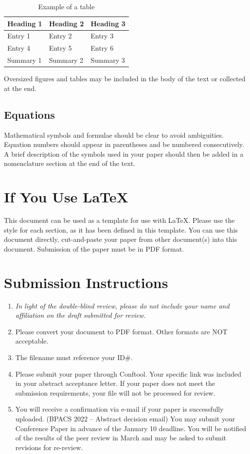 \documentclass[twocolumn, 10pt, times, letterpaper]{article}
\begin{document}
\begin{table}[h!]
\caption{Example of a table}
\centering
\begin{tabular}{lll} \hline
\bf Heading 1 & \bf Heading 2 & \bf Heading 3 \\ \hline
Entry 1 & Entry 2 & Entry 3 \\ 
Entry 4 & Entry 5 & Entry 6 \\ \hline
Summary 1 & Summary 2 & Summary 3 \\ 
\end{tabular}
\label{table1}
\end{table}

Oversized figures and tables may be included in the body of the text or collected at the end. 

\subsection{Equations}
Mathematical symbols and formulae should be clear to avoid ambiguities. Equation numbers should appear in parentheses and be numbered consecutively. A brief description of the symbols used in your paper should then be added in a nomenclature section at the end of the text.

\section{If You Use \LaTeX}
This document can be used as a template for use with \LaTeX. Please use the style for each section, as it has been defined in this template. You can use this document directly, cut-and-paste your paper from other document(s) into this document.
Submission of the paper must be in PDF format.

\section{Submission Instructions}
\begin{enumerate}
\setlength\itemsep{0em}
\item {\it In light of the double-blind review, please do not include your name and affiliation on the draft submitted for review.}
\item Please convert your document to PDF format. Other formats are NOT acceptable.
\item The filename must reference your ID\#. 
\item Please submit your paper through Conftool. Your specific link was included in your abstract acceptance letter.  If your paper does not meet the submission requirements, your file will not be processed for review. 
\item  You will receive a confirmation via e-mail if your paper is successfully uploaded. (BPACS 2022 -- Abstract decision email) You may submit your Conference Paper in advance of the January 10 deadline. You will be notified of the results of the peer review in March and may be asked to submit revisions for re-review.
\end{enumerate}
\end{document}
